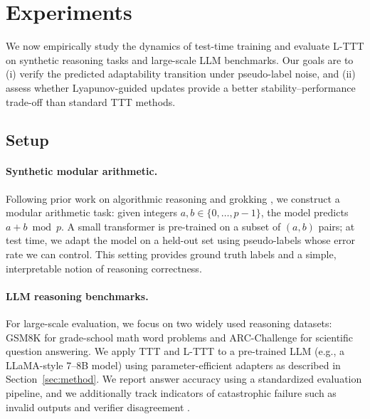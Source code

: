\documentclass{article}
\theoremstyle{plain}
\theoremstyle{definition}
\theoremstyle{remark}
\begin{document}
\section{Experiments}
\label{sec:experiments}

We now empirically study the dynamics of test-time training and evaluate L-TTT on synthetic reasoning tasks and large-scale LLM benchmarks. Our goals are to (i) verify the predicted adaptability transition under pseudo-label noise, and (ii) assess whether Lyapunov-guided updates provide a better stability--performance trade-off than standard TTT methods.

\subsection{Setup}

\paragraph{Synthetic modular arithmetic.}
Following prior work on algorithmic reasoning and grokking \cite{power2022grokking,liu2024physics}, we construct a modular arithmetic task: given integers $a,b \in \{0,\dots,p-1\}$, the model predicts $a+b \bmod p$. A small transformer is pre-trained on a subset of $(a,b)$ pairs; at test time, we adapt the model on a held-out set using pseudo-labels whose error rate we can control. This setting provides ground truth labels and a simple, interpretable notion of reasoning correctness.

\paragraph{LLM reasoning benchmarks.}
For large-scale evaluation, we focus on two widely used reasoning datasets: GSM8K for grade-school math word problems and ARC-Challenge for scientific question answering. We apply TTT and L-TTT to a pre-trained LLM (e.g., a LLaMA-style 7--8B model) using parameter-efficient adapters as described in Section~\ref{sec:method}. We report answer accuracy using a standardized evaluation pipeline, and we additionally track indicators of catastrophic failure such as invalid outputs and verifier disagreement \cite{selfconsistency2022,lightman2024let}.
\end{document}
